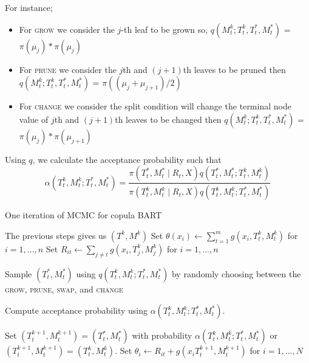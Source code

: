\documentclass{amsart}
\begin{document}
For instance;

\begin{itemize}
	\item For \textsc{grow} we consider the $j$-th leaf to be grown so,
	$q\left(M_t^k;T_t^k, T_t^\ast, M_t^\ast\right)$ = $\pi(\mu_j)*\pi(\mu_j)$
	\item For \textsc{prune} we consider the $j$th and $(j+1)$th leaves to be pruned then $q\left(M_t^k;T_t^k, T_t^\ast, M_t^\ast\right)$ = $\pi((\mu_j + \mu_{j+1})/2)$
	\item For \textsc{change} we consider the split condition will change the terminal node value of $j$th and $(j+1)$th leaves to be changed then $q\left(M_t^k;T_t^k, T_t^\ast, M_t^\ast\right)$ = $\pi(\mu_j)*\pi(\mu_{j+1})$
\end{itemize}

Using $q$, we calculate the acceptance probability such that
\begin{equation}
	\alpha\left(T_t^k,M_t^k;T_t^\ast, M_t^\ast\right)
	= \frac{\pi(T_t^\ast,M_t^\ast \mid R_t, X)q\left(T_t^\ast, M_t^\ast;T_t^k,M_t^k\right)}
	{\pi(T_t^k,M_t^k \mid R_t, X)q\left(T_t^k,M_t^k;T_t^\ast, M_t^\ast\right)}
\end{equation}

\begin{algorithm}
	\caption{One iteration of MCMC for copula BART}
	
	\begin{algorithmic}[1]
		\State The previous steps gives us $(T^k,M^k)$
		\State Set $\theta(x_i) \leftarrow \sum_{t=1}^{m} g(x_i, T^k_t, M^k_t)$ for $i = 1, \ldots, n$
		\State Set $R_{it} \leftarrow \sum_{j\not=t}g(x_i, T_j^k, M_j^k)$ for $i = 1, \ldots, n$
		
		\State Sample $(T_t^\ast, M_t^\ast)$ using $q\left(T_t^k,M_t^k;T_t^\ast, M_t^\ast\right)$ by randomly choosing between the \textsc{grow}, \textsc{prune}, \textsc{swap}, and \textsc{change} 
		
		\State Compute acceptance probability using $\alpha\left(T_t^k,M_t^k;T_t^\ast, M_t^\ast\right)$.
		
		\State Set $(T_t^{k+1}, M_t^{k+1})=(T_t^\ast, M_t^\ast)$ with probability $\alpha\left(T_t^k,M_t^k;T_t^\ast, M_t^\ast\right)$ or $(T_t^{k+1}, M_t^{k+1})=(T_t^k,M_t^k)$.
		\State Set $\theta_i \leftarrow R_{it} + g(x_i T_t^{k+1}, M_t^{k+1})$ for $i = 1, \ldots, N$
		\EndFor
	\end{algorithmic}
\end{algorithm}
\end{document}
